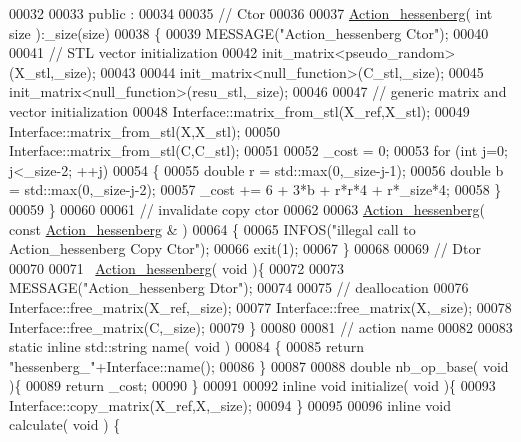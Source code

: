 \begin{DoxyCode}
00032 
00033 public :
00034 
00035   \textcolor{comment}{// Ctor}
00036 
00037   \hyperlink{class_action__hessenberg}{Action\_hessenberg}( \textcolor{keywordtype}{int} size ):\_size(size)
00038   \{
00039     MESSAGE(\textcolor{stringliteral}{"Action\_hessenberg Ctor"});
00040 
00041     \textcolor{comment}{// STL vector initialization}
00042     init\_matrix<pseudo\_random>(X\_stl,\_size);
00043 
00044     init\_matrix<null\_function>(C\_stl,\_size);
00045     init\_matrix<null\_function>(resu\_stl,\_size);
00046 
00047     \textcolor{comment}{// generic matrix and vector initialization}
00048     Interface::matrix\_from\_stl(X\_ref,X\_stl);
00049     Interface::matrix\_from\_stl(X,X\_stl);
00050     Interface::matrix\_from\_stl(C,C\_stl);
00051 
00052     \_cost = 0;
00053     \textcolor{keywordflow}{for} (\textcolor{keywordtype}{int} j=0; j<\_size-2; ++j)
00054     \{
00055       \textcolor{keywordtype}{double} r = std::max(0,\_size-j-1);
00056       \textcolor{keywordtype}{double} b = std::max(0,\_size-j-2);
00057       \_cost += 6 + 3*b + r*r*4 + r*\_size*4;
00058     \}
00059   \}
00060 
00061   \textcolor{comment}{// invalidate copy ctor}
00062 
00063   \hyperlink{class_action__hessenberg}{Action\_hessenberg}( \textcolor{keyword}{const}  \hyperlink{class_action__hessenberg}{Action\_hessenberg} & )
00064   \{
00065     INFOS(\textcolor{stringliteral}{"illegal call to Action\_hessenberg Copy Ctor"});
00066     exit(1);
00067   \}
00068 
00069   \textcolor{comment}{// Dtor}
00070 
00071   ~\hyperlink{class_action__hessenberg}{Action\_hessenberg}( \textcolor{keywordtype}{void} )\{
00072 
00073     MESSAGE(\textcolor{stringliteral}{"Action\_hessenberg Dtor"});
00074 
00075     \textcolor{comment}{// deallocation}
00076     Interface::free\_matrix(X\_ref,\_size);
00077     Interface::free\_matrix(X,\_size);
00078     Interface::free\_matrix(C,\_size);
00079   \}
00080 
00081   \textcolor{comment}{// action name}
00082 
00083   \textcolor{keyword}{static} \textcolor{keyword}{inline} std::string name( \textcolor{keywordtype}{void} )
00084   \{
00085     \textcolor{keywordflow}{return} \textcolor{stringliteral}{"hessenberg\_"}+Interface::name();
00086   \}
00087 
00088   \textcolor{keywordtype}{double} nb\_op\_base( \textcolor{keywordtype}{void} )\{
00089     \textcolor{keywordflow}{return} \_cost;
00090   \}
00091 
00092   \textcolor{keyword}{inline} \textcolor{keywordtype}{void} initialize( \textcolor{keywordtype}{void} )\{
00093     Interface::copy\_matrix(X\_ref,X,\_size);
00094   \}
00095 
00096   \textcolor{keyword}{inline} \textcolor{keywordtype}{void} calculate( \textcolor{keywordtype}{void} ) \{

\end{DoxyCode}

